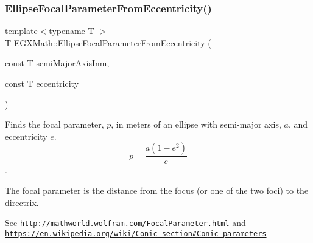 \mbox{\label{group___e_g_x_math-_geometry-2_d-_ellipse-_focal_parameter_gafd838410a3f813315166c64b53e0e25b}} 
\subsubsection{\texorpdfstring{Ellipse\+Focal\+Parameter\+From\+Eccentricity()}{EllipseFocalParameterFromEccentricity()}}
{\footnotesize\ttfamily template$<$typename T $>$ \\
T E\+G\+X\+Math\+::\+Ellipse\+Focal\+Parameter\+From\+Eccentricity (\begin{DoxyParamCaption}\item[{const T}]{semi\+Major\+Axis\+Inm,  }\item[{const T}]{eccentricity }\end{DoxyParamCaption})}



Finds the focal parameter, $p$, in meters of an ellipse with semi-\/major axis, $a$, and eccentricity $e$. \[ p=\frac{a(1-e^2)}{e} \]. 

The focal parameter is the distance from the focus (or one of the two foci) to the directrix.

See \href{http://mathworld.wolfram.com/FocalParameter.html}{\tt http\+://mathworld.\+wolfram.\+com/\+Focal\+Parameter.\+html} and \href{https://en.wikipedia.org/wiki/Conic_section#Conic_parameters}{\tt https\+://en.\+wikipedia.\+org/wiki/\+Conic\+\_\+section\#\+Conic\+\_\+parameters}


